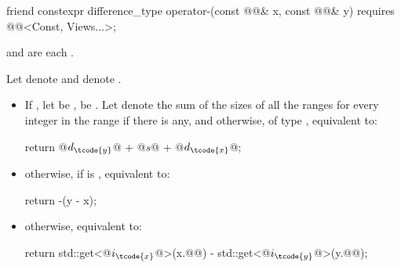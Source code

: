 %
\begin{itemdecl}
friend constexpr difference_type operator-(const @@& x, const @@& y)
  requires @@<Const, Views...>;
\end{itemdecl}

\begin{itemdescr}
\pnum
\expects
{} and
 are each .

\pnum
\effects
Let
 denote  and
 denote .

\begin{itemize}
\item
If , let
 be
,
 be
.
Let  denote the sum of the sizes of all the ranges
for every integer  in the range
if there is any, and
 otherwise,
of type ,
equivalent to:
\begin{codeblock}
return @$d_\tcode{y}$@ + @$s$@ + @$d_\tcode{x}$@;
\end{codeblock}

\item
otherwise, if  is ,
equivalent to:
\begin{codeblock}
return -(y - x);
\end{codeblock}

\item
otherwise, equivalent to:
\begin{codeblock}
return std::get<@$i_\tcode{x}$@>(x.@@) - std::get<@$i_\tcode{y}$@>(y.@@);
\end{codeblock}
\end{itemize}
\end{itemdescr}

